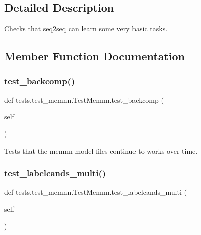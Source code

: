 \subsection{Detailed Description}
\begin{DoxyVerb}Checks that seq2seq can learn some very basic tasks.
\end{DoxyVerb}
 

\subsection{Member Function Documentation}
\mbox{\label{classtests_1_1test__memnn_1_1TestMemnn_a2c3a2e42a94e00651ee32a03d9b7ba84}} 
\subsubsection{\texorpdfstring{test\+\_\+backcomp()}{test\_backcomp()}}
{\footnotesize\ttfamily def tests.\+test\+\_\+memnn.\+Test\+Memnn.\+test\+\_\+backcomp (\begin{DoxyParamCaption}\item[{}]{self }\end{DoxyParamCaption})}

\begin{DoxyVerb}Tests that the memnn model files continue to works over time.
\end{DoxyVerb}
 \mbox{\label{classtests_1_1test__memnn_1_1TestMemnn_a2e52386c91c00701e4e58c72e100074d}} 
\subsubsection{\texorpdfstring{test\+\_\+labelcands\+\_\+multi()}{test\_labelcands\_multi()}}
{\footnotesize\ttfamily def tests.\+test\+\_\+memnn.\+Test\+Memnn.\+test\+\_\+labelcands\+\_\+multi (\begin{DoxyParamCaption}\item[{}]{self }\end{DoxyParamCaption})}

